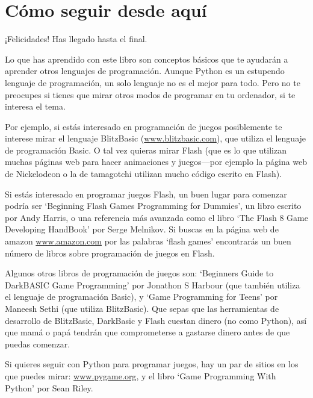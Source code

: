 

\chapter{Cómo seguir desde aquí}

¡Felicidades! Has llegado hasta el final.
\par
Lo que has aprendido con este libro son conceptos básicos que te ayudarán a aprender otros lenguajes de programación.  Aunque Python es un estupendo lenguaje de programación, un solo lenguaje no es el mejor para todo. Pero no te preocupes si tienes que mirar otros modos de programar en tu ordenador, si te interesa el tema.

Por ejemplo, si estás interesado en programación de juegos posiblemente te interese mirar el lenguaje BlitzBasic (\href{http://www.blitzbasic.com}{www.blitzbasic.com}), que utiliza el lenguaje de programación Basic. O tal vez quieras mirar Flash (que es lo que utilizan muchas páginas web para hacer animaciones y juegos---por ejemplo la página web de Nickelodeon o la de tamagotchi utilizan mucho código escrito en Flash).

Si estás interesado en programar juegos Flash, un buen lugar para comenzar podría ser `Beginning Flash Games Programming for Dummies', un libro escrito por Andy Harris, o una referencia más avanzada como el libro `The Flash 8 Game Developing HandBook' por Serge Melnikov.  Si buscas en la página web de amazon \href{http://www.amazon.com}{www.amazon.com} por las palabras `flash games' encontrarás un buen número de libros sobre programación de juegos en Flash.

Algunos otros libros de programación de juegos son: `Beginners Guide to DarkBASIC Game Programming' por Jonathon S Harbour (que también utiliza el lenguaje de programación Basic), y `Game Programming for Teens' por Maneesh Sethi (que utiliza BlitzBasic). Que sepas que las herramientas de desarrollo de BlitzBasic, DarkBasic y Flash cuestan dinero (no como Python), así que mamá o papá tendrán que comprometerse a gastarse dinero antes de que puedas comenzar.

Si quieres seguir con Python para programar juegos, hay un par de sitios en los que puedes mirar: \href{http://www.pygame.org}{www.pygame.org}, y el libro `Game Programming With Python' por Sean Riley.

